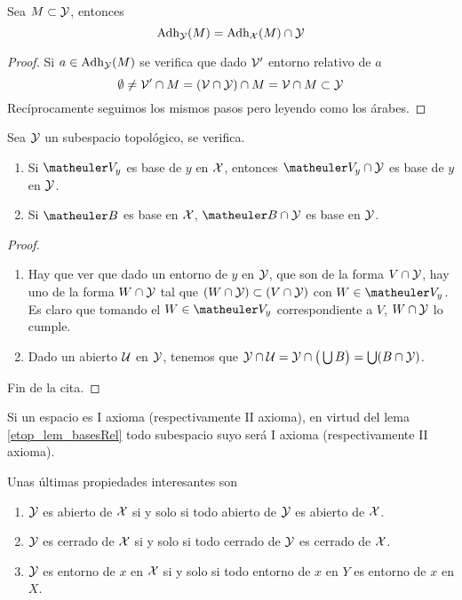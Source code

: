\begin{prop}
	Sea $M \subset \mathcal{Y}$, entonces \[\operatorname{\mathrm{Adh}}_{\mathcal{Y}}(M)=\operatorname{\mathrm{Adh}}_{\mathcal{X}}(M)\cap\mathcal{Y}\]
\end{prop}
\begin{proof}
	Si $a \in \operatorname{\mathrm{Adh}}_{\mathcal{Y}}(M)$ se verifica que dado $\mathcal{V}'$ entorno relativo de $a$
	\[\emptyset\not=\mathcal{V}' \cap M = (\mathcal{V}\cap\mathcal{Y})\cap M = \mathcal{V} \cap M\subset\mathcal{Y}\]
	Recíprocamente seguimos los mismos pasos pero leyendo como los árabes.
\end{proof}
\begin{lem}
	\label{etop_lem_basesRel}
	Sea $\mathcal{Y}$ un subespacio topológico, se verifica.
	\begin{enumerate}
		\item Si $\Va{y}$ es base de $y$ en $\mathcal{X}$, entonces $\Va{y} \cap \Y$ es base de $y$ en $\mathcal{Y}$.
		\item Si $\B$ es base en $\mathcal{X}$, $\B \cap \Y$ es base en $\mathcal{Y}$.
	\end{enumerate}
\end{lem}
\begin{proof}
	\begin{enumerate}
		\item Hay que ver que dado un entorno de $y$ en $\mathcal{Y}$, que son de la forma $V \cap \mathcal{Y}$, hay uno de la forma $W \cap \mathcal{Y}$ tal que $(W \cap \mathcal{Y}) \subset (V \cap \mathcal{Y})$ con $W\in\Va{y}$. Es claro que tomando el $W\in\Va{y}$ correspondiente a $V$, $W \cap \mathcal{Y}$ lo cumple.
		\item Dado un abierto $\mathcal{U}$ en $\mathcal{Y}$, tenemos que $\mathcal{Y} \cap \mathcal{U} = \mathcal{Y} \cap \big( \bigcup B \big) = \bigcup (B \cap \mathcal{Y})$.
	\end{enumerate}
	Fin de la cita.
\end{proof}
\begin{obs}
	\label{etop_obs_axiomasHereditarios}
	Si un espacio es I axioma (respectivamente II axioma), en virtud del lema \ref{etop_lem_basesRel} todo subespacio suyo será I axioma (respectivamente II axioma).
\end{obs}
\begin{lem}
	\label{etop_lem_otrasProp}
	Unas últimas propiedades interesantes son
	\begin{enumerate}
		\item $\mathcal{Y}$ es abierto de $\mathcal{X}$ si y solo si todo abierto de $\mathcal{Y}$ es abierto de $\mathcal{X}$.
		\item $\mathcal{Y}$ es cerrado de $\mathcal{X}$ si y solo si todo cerrado de $\mathcal{Y}$ es cerrado de $\mathcal{X}$.
		\item $\mathcal{Y}$ es entorno de $x$ en $\mathcal{X}$ si y solo si todo entorno de $x$ en $Y$ es entorno de $x$ en $X$.
	\end{enumerate}
\end{lem}
